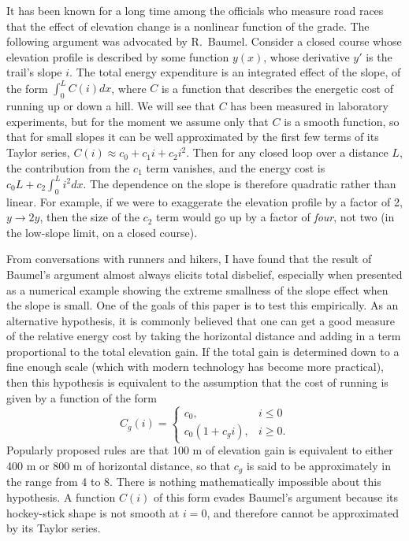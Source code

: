 \documentclass[10pt,letterpaper]{article}
\begin{document}
It has been known for a long
time among the officials who measure road races that the effect
of elevation change is a nonlinear function of the grade. The following argument 
was advocated by R.~Baumel.\cite{baumel}
Consider a closed course whose elevation
profile is described by some function $y(x)$, whose derivative $y'$ is the trail's slope $i$.
The total energy expenditure is an integrated effect of the slope, of the form $\int_0^L C(i)dx$,
where $C$ is a function that describes the energetic cost of running up or down a hill.
We will see that $C$ has been measured in laboratory experiments, but for the moment we assume
only that $C$ is a smooth function, so that for small slopes it can be well approximated by the first few terms
of its Taylor series, $C(i)\approx c_0+c_1 i+c_2 i^2$. Then for any closed loop over a distance $L$,
the contribution from the $c_1$ term vanishes, and the energy cost is $c_0 L+c_2 \int_0^L i^2 dx$.
The dependence on the slope is therefore quadratic rather than linear. For example, if we were to exaggerate the
elevation profile by a factor of 2, $y\rightarrow 2y$, then the size of the $c_2$ term would go up by
a factor of \emph{four}, not two (in the low-slope limit, on a closed course).

From conversations with runners and hikers, I have found that the result of Baumel's argument almost
always elicits total disbelief, especially when presented as a numerical example showing the extreme smallness
of the slope effect when the slope is small. One of the goals of this paper is to test this empirically.
As an alternative hypothesis, it is commonly believed that one can get a good measure
of the relative energy cost by taking the horizontal distance and adding in a term proportional to the total elevation gain.
If the total gain is determined down to a fine enough scale (which with modern technology has become
more practical), then this hypothesis is equivalent to the assumption that the cost of running is
given by a function of the form
\begin{equation}\label{eq:gain-only}
   C_g(i) = 
  \begin{cases}
     c_0, & i\le0 \\
     c_0(1+c_g i), & i\ge 0.
  \end{cases}
\end{equation}
Popularly proposed rules are that 100 m of elevation gain is equivalent to either 400 m or 800 m of horizontal distance,
so that $c_g$ is said to be approximately in the range from 4 to 8. There is nothing mathematically impossible
about this hypothesis. A function $C(i)$ of this form evades Baumel's argument because its hockey-stick shape
is not smooth at $i=0$, and therefore cannot be approximated by its Taylor series.
\end{document}
